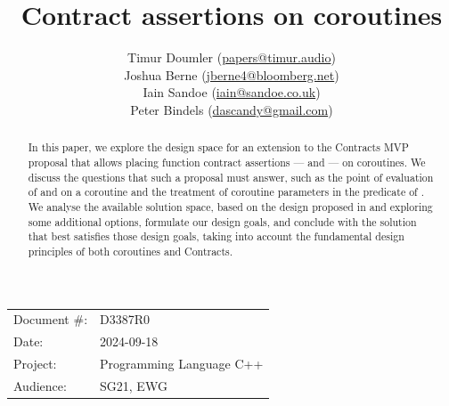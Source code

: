 

 \usepackage[bottom]{footmisc} 

 \usepackage{longtable}


\usepackage{tikz,lipsum,lmodern}
\usepackage[most]{tcolorbox}



\usepackage{titlesec}
\usepackage{tocloft}


\newcommand{\changelocaltocdepth}[1]{%
  \addtocontents{toc}{\protect\setcounter{tocdepth}{#1}}%
  \setcounter{tocdepth}{#1}%
}

\setcounter{tocdepth}{3}



\title{Contract assertions on coroutines}
\author{
Timur Doumler \small(\href{mailto:papers@timur.audio}{papers@timur.audio}) \\
Joshua Berne \small(\href{mailto:jberne4@bloomberg.net}{jberne4@bloomberg.net}) \\
Iain Sandoe \small(\href{mailto:iain@sandoe.co.uk}{iain@sandoe.co.uk}) \\
Peter Bindels \small(\href{mailto:dascandy@gmail.com}{dascandy@gmail.com}) 
}
\date{}
\maketitle

\begin{tabular}{ll}
Document \#: & D3387R0 \\
Date: &2024-09-18 \\
Project: & Programming Language C++ \\
Audience: & SG21, EWG
\end{tabular}

\begin{abstract}
In this paper, we explore the design space for an extension to the Contracts MVP proposal \cite{P2900R8} that allows placing function contract assertions ---  and 
 --- on coroutines. We discuss the questions that such a proposal must answer, such as the point of evaluation of  and  on a coroutine and the treatment of coroutine parameters in the predicate of . We analyse the available solution space, based on the design proposed in \cite{P2957R1} and exploring some additional options, formulate our design goals, and conclude with the solution that best satisfies those design goals, taking into account the fundamental design principles of both coroutines and Contracts.
\end{abstract}

